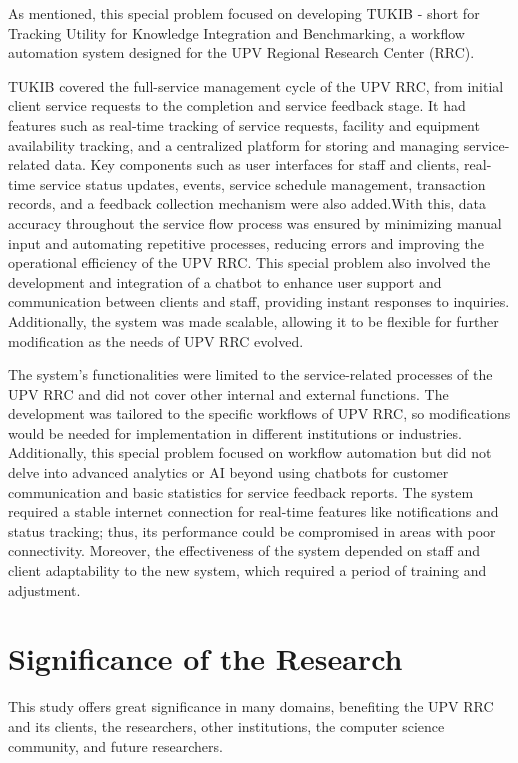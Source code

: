 As mentioned, this special problem focused on developing TUKIB - short for Tracking Utility for Knowledge Integration and Benchmarking, a workflow automation system designed for the UPV Regional Research Center (RRC). 

TUKIB covered the full-service management cycle of the UPV RRC, from initial client service requests to the completion and service feedback stage. It had features such as real-time tracking of service requests, facility and equipment availability tracking, and a centralized platform for storing and managing service-related data. Key components such as user interfaces for staff and clients, real-time service status updates, events, service schedule management, transaction records, and a feedback collection mechanism were also added.With this, data accuracy throughout the service flow process was ensured by minimizing manual input and automating repetitive processes, reducing errors and improving the operational efficiency of the UPV RRC. This special problem also involved the development and integration of a chatbot to enhance user support and communication between clients and staff, providing instant responses to inquiries. Additionally, the system was made scalable, allowing it to be flexible for further modification as the needs of UPV RRC evolved.

The system’s functionalities were limited to the service-related processes of the UPV RRC and did not cover other internal and external functions. The development was tailored to the specific workflows of UPV RRC, so modifications would be needed for implementation in different institutions or industries. Additionally, this special problem focused on workflow automation but did not delve into advanced analytics or AI beyond using chatbots for customer communication and basic statistics for service feedback reports. The system required a stable internet connection for real-time features like notifications and status tracking; thus, its performance could be compromised in areas with poor connectivity. Moreover, the effectiveness of the system depended on staff and client adaptability to the new system, which required a period of training and adjustment.

\section{Significance of the Research}
\label{sec:significance}

This study offers great significance in many domains, benefiting the UPV RRC and its clients, the researchers, other institutions, the computer science community, and future researchers.

